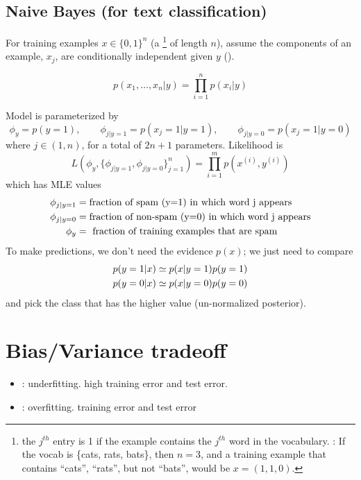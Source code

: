 \documentclass[11pt]{article}
\begin{document}
\TODOFIN{}

\subsection{Naive Bayes (for text classification)}
For training examples $x \in \{0,1\}^n$ (a \footnote{the
  $j^{th}$ entry is 1 if the example contains the $j^{th}$ word in the
  vocabulary. : If the vocab is \{cats, rats, bats\}, then $n=3$,
  and a training example that contains ``cats'', ``rats'', but not ``bats'',
  would be $x = (1, 1, 0)$.} of length $n$), assume the components of an
example, $x_j$, are conditionally independent given $y$ ().

\begin{equation}
  p(x_1, \dots, x_n | y) = \prod_{i=1}^n p(x_i | y)
\end{equation}

Model is parameterized by
\begin{equation}
  \phi_y = p(y=1),\qquad \phi_{j|y=1} = p(x_j=1|y=1), \qquad \phi_{j|y=0} =
  p(x_j=1|y=0)
\end{equation}
where $j \in (1, n)$, for a total of $2n +1$ parameters. Likelihood is
\begin{equation}
  L(\phi_y, \{\phi_{j|y=1}, \phi_{j|y=0}\}_{j=1}^n) = \prod_{i=1}^m
  p(x^{(i)}, y^{(i)})
\end{equation}
which has MLE values
\begin{align}
  \phi_{j|y=1} &= \textrm{fraction of spam (y=1) in which word j appears}\nonumber\\
  \phi_{j|y=0} &= \textrm{fraction of non-spam (y=0) in which word j appears}\nonumber\\
  \phi_{y} &=  \textrm{ fraction of training examples that are spam}
\end{align}
To make predictions, we don't need the evidence $p(x)$; we just need to compare
\begin{align}
  p(y=1|x) &\simeq p(x|y=1)p(y=1)\nonumber\\
  p(y=0|x) &\simeq p(x|y=0)p(y=0)
\end{align}
and pick the class that has the higher value (un-normalized posterior).




\section{Bias/Variance tradeoff}
\label{sec:bias_var}
\begin{itemize}
  \setlength\itemsep{1pt}
  \item {}: underfitting. high training error and test error.
  \item {}: overfitting.  training error and
   test error
\end{itemize}
\end{document}
